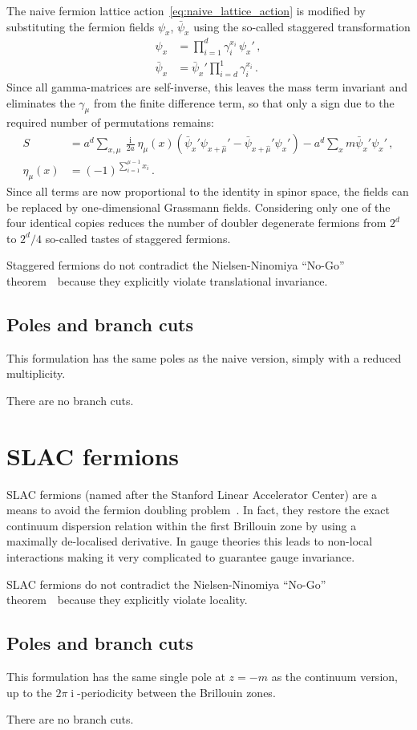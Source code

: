 \documentclass[a4paper]{article}
\DeclareMathOperator{\im}{i}
\newcommand{\nnt}{Nielsen-Ninomiya ``No-Go'' theorem~\cite{NIELSEN1981219}}
\begin{document}
	The naive fermion lattice action~\eqref{eq:naive_lattice_action} is modified by substituting the fermion fields $\psi_x$, $\bar\psi_x$ using the so-called staggered transformation
	\begin{align}
		\psi_x &= \prod_{i=1}^{d}\gamma_i^{x_i}\,\psi_x'\,,\\
		\bar\psi_x &= \bar\psi_x'\prod_{i=d}^{1}\gamma_i^{x_i}\,.
	\end{align}
	Since all gamma-matrices are self-inverse, this leaves the mass term invariant and eliminates the $\gamma_\mu$ from the finite difference term, so that only a sign due to the required number of permutations remains:
	\begin{align}
		S &= a^d\sum_{x,\mu}\frac{\im}{2a}\eta_\mu(x)\left(\bar\psi_x'\psi_{x+\hat\mu}'-\bar\psi_{x+\hat\mu}'\psi_{x}'\right) - a^d\sum_x m\bar\psi_x'\psi_x'\,, \label{eq:staggered_lattice_action}\\
		\eta_\mu(x) &= (-1)^{\sum_{i=1}^{\mu-1}x_i}\,.
	\end{align}
	Since all terms are now proportional to the identity in spinor space, the fields can be replaced by one-dimensional Grassmann fields. Considering only one of the four identical copies reduces the number of doubler degenerate fermions from $2^d$ to $2^d/4$ so-called tastes of staggered fermions.
	
	Staggered fermions do not contradict the \nnt\ because they explicitly violate translational invariance.
	
	\subsection{Poles and branch cuts}
	This formulation has the same poles as the naive version, simply with a reduced multiplicity.
	
	There are no branch cuts.
	
	\section{SLAC fermions}
	SLAC fermions (named after the Stanford Linear Accelerator Center) are a means to avoid the fermion doubling problem~\cite{SLAC_fermions}. In fact, they restore the exact continuum dispersion relation within the first Brillouin zone by using a maximally de-localised derivative. In gauge theories this leads to non-local interactions making it very complicated to guarantee gauge invariance.
	
	SLAC fermions do not contradict the \nnt\ because they explicitly violate locality.
	
	\subsection{Poles and branch cuts}
	This formulation has the same single pole at $z=-m$ as the continuum version, up to the $2\pi\im$-periodicity between the Brillouin zones.
	
	There are no branch cuts.
	
	\clearpage
	\printbibliography
\end{document}
